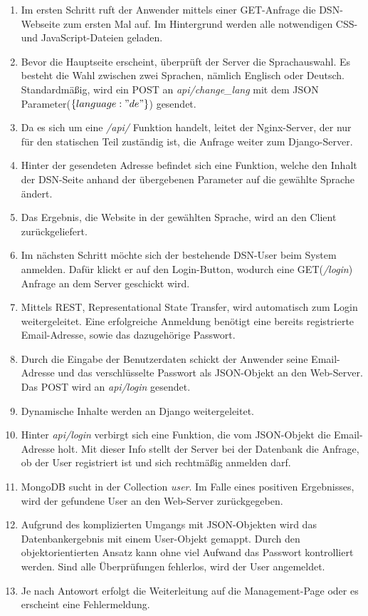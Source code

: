 \begin{enumerate}
\item Im ersten Schritt ruft der Anwender mittels einer GET-Anfrage die DSN-Webseite zum ersten Mal auf. Im Hintergrund werden alle notwendigen CSS- und JavaScript-Dateien geladen.
\item Bevor die Hauptseite erscheint, überprüft der Server die Sprachauswahl. Es besteht die Wahl zwischen zwei Sprachen, nämlich Englisch oder Deutsch.\\
Standardmäßig, wird ein POST an \textit{api/change\_lang} mit dem JSON Parameter($\{language:"de"\}$) gesendet.
\item Da es sich um eine \textit{/api/} Funktion handelt, leitet der Nginx-Server, der nur für den statischen Teil zuständig ist, die Anfrage weiter zum Django-Server.
\item Hinter der gesendeten Adresse befindet sich eine Funktion, welche den Inhalt der DSN-Seite anhand der übergebenen Parameter auf die gewählte Sprache ändert.
\item Das Ergebnis, die Website in der gewählten Sprache, wird an den Client zurückgeliefert.
\item Im nächsten Schritt möchte sich der bestehende DSN-User beim System anmelden. Dafür klickt er auf den Login-Button, wodurch eine GET(\textit{/login}) Anfrage an dem Server geschickt wird.
\item Mittels \gls{REST}, Representational State Transfer, wird automatisch zum Login weitergeleitet. Eine erfolgreiche Anmeldung benötigt eine bereits registrierte Email-Adresse, sowie das dazugehörige Passwort.
\item Durch die Eingabe der Benutzerdaten schickt der Anwender seine Email-Adresse und das verschlüsselte Passwort als JSON-Objekt an den Web-Server. Das POST wird an \textit{api/login} gesendet.
\item Dynamische Inhalte werden an Django weitergeleitet.
\item Hinter \textit{api/login} verbirgt sich eine Funktion, die vom JSON-Objekt die Email-Adresse holt. Mit dieser Info stellt der Server bei der Datenbank die Anfrage, ob der User registriert ist und sich rechtmäßig anmelden darf.
\item MongoDB sucht in der Collection \textit{user}. Im Falle eines positiven Ergebnisses, wird der gefundene User an den Web-Server zurückgegeben.
\item Aufgrund des komplizierten Umgangs mit JSON-Objekten wird das Datenbankergebnis mit einem User-Objekt gemappt. Durch den objektorientierten Ansatz kann ohne viel Aufwand das Passwort kontrolliert werden. Sind alle Überprüfungen fehlerlos, wird der User angemeldet.
\item Je nach Antowort erfolgt die Weiterleitung auf die Management-Page oder es erscheint eine Fehlermeldung.
\end{enumerate}

